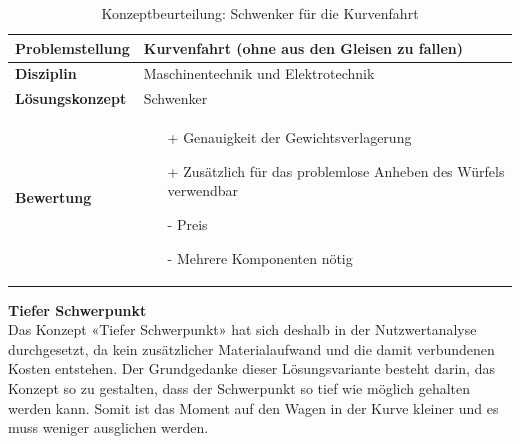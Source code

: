 \documentclass[../../main.tex]{subfiles}
\begin{document}
    \begin{flushleft}
        \begin{table}[h]
        \begin{tabular}{ | l | p{11cm} |}
        \hline
        \textbf{Problemstellung} & Kurvenfahrt (ohne aus den Gleisen zu fallen) \\ \hline
        \textbf{Disziplin} & Maschinentechnik und Elektrotechnik \\ \hline
        \textbf{Lösungskonzept} & Schwenker \\ \hline
        \textbf{Bewertung} &  \begin{itemize}
                                \item[+] Genauigkeit der Gewichtsverlagerung
                                \item[+] Zusätzlich für das problemlose Anheben des Würfels verwendbar
                                \item[-] Preis 
                                \item[-] Mehrere Komponenten nötig 
                              \end{itemize} \\ \hline
        \end{tabular}
        \caption{Konzeptbeurteilung: Schwenker für die Kurvenfahrt}
        \label{tab:konzept_fahrwerk_schwenker}
    \end{table}
    \end{flushleft}

    \textbf{Tiefer Schwerpunkt}\\
    Das Konzept «Tiefer Schwerpunkt» hat sich deshalb in der Nutzwertanalyse durchgesetzt, da kein zusätzlicher Materialaufwand und die damit verbundenen Kosten entstehen. Der Grundgedanke dieser Lösungsvariante besteht darin, das Konzept so zu gestalten, dass der Schwerpunkt so tief wie möglich gehalten werden kann. Somit ist das Moment auf den Wagen in der Kurve kleiner und es muss weniger ausglichen werden.
\end{document}
